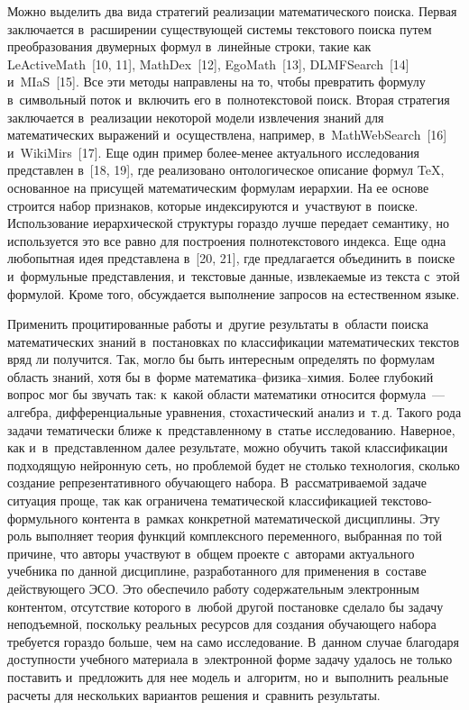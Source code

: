 \begin{multicols}{2}
     Можно выделить два вида стратегий реализации математического 
поиска. Первая заключается в~расширении существующей сис\-те\-мы 
текс\-то\-во\-го поиска путем преобразования двумерных формул в~линейные 
строки, такие как \mbox{LeActiveMath}~[10, 11], \mbox{MathDex}~[12], \mbox{EgoMath}~[13], 
\mbox{DLMFSearch}~[14] и~MIaS~[15]. Все эти методы на\-прав\-ле\-ны на то, чтобы 
превратить формулу в~символьный поток и~включить его в~пол\-но\-текс\-то\-вой 
поиск. Вторая стратегия заключается в~реализации некоторой модели 
извлечения знаний для математических выражений и~осуществлена, 
например, в~\mbox{MathWebSearch}~[16] и~\mbox{WikiMirs}~[17]. Еще один пример  
бо\-лее-ме\-нее актуального исследования пред\-став\-лен в~[18, 19], где 
реализовано онтологическое описание формул TeX, основанное на присущей 
математическим формулам иерархии. На ее основе строится набор 
при\-зна\-ков, которые индексируются и~участвуют в~поиске. Использование 
иерархической структуры гораздо лучше передает семантику, но 
используется это все рав\-но для по\-стро\-ения пол\-но\-текс\-то\-во\-го индекса. Еще 
одна любопытная идея пред\-став\-ле\-на в~[20, 21], где предлагается объединить 
в~поиске и~формульные пред\-став\-ле\-ния, и~текс\-то\-вые данные, из\-вле\-ка\-емые из 
текс\-та с~этой формулой. Кроме того, об\-суж\-да\-ет\-ся выполнение запросов на 
естественном языке.
     
     Применить процитированные работы и~другие результаты в~об\-ласти 
поиска математических знаний в~по\-ста\-нов\-ках по классификации 
математических текс\-тов вряд ли получится. Так, могло бы быть интересным 
определять по формулам об\-ласть знаний, хотя бы в~фор\-ме  
ма\-те\-ма\-ти\-ка--фи\-зи\-ка--хи\-мия. Более глубокий вопрос мог бы звучать 
так: к~какой об\-ласти математики относится формула~--- алгебра, 
дифференциальные урав\-не\-ния, сто\-ха\-сти\-че\-ский анализ и~т.\,д. Такого рода 
задачи тематически ближе к~пред\-став\-лен\-но\-му в~\mbox{статье} исследованию. 
Наверное, как и~в~пред\-став\-лен\-ном далее результате, мож\-но \mbox{обучить} такой 
классификации подходящую нейронную сеть, но проб\-ле\-мой будет не столько 
технология, сколько создание репрезентативного обуча\-юще\-го набора. 
В~рас\-смат\-ри\-ва\-емой задаче ситуация проще, так как ограничена 
тематической классификацией текс\-то\-во-фор\-муль\-но\-го контента 
в~рамках конкретной математической дис\-цип\-ли\-ны. Эту роль выполняет 
тео\-рия функций комплексного переменного, выбранная по той причине, что 
авторы участвуют в~общем проекте с~авторами актуального учеб\-ни\-ка по 
данной дисциплине, раз\-ра\-бо\-тан\-но\-го для применения в~со\-ста\-ве дей\-ст\-ву\-юще\-го 
ЭСО. Это обеспечило работу содержательным электронным кон\-тен\-том, 
отсутствие которого в~любой другой по\-ста\-нов\-ке сделало бы задачу 
неподъемной, поскольку реальных ресурсов для создания обуча\-юще\-го 
набора требуется гораздо больше, чем на само исследование. В~данном 
случае благодаря до\-ступ\-ности учебного материала в~электронной форме 
задачу удалось не только по\-ста\-вить и~предложить для нее модель и~алгоритм, 
но и~выполнить реальные расчеты для нескольких вариантов решения 
и~сравнить результаты.
     

\end{multicols}
